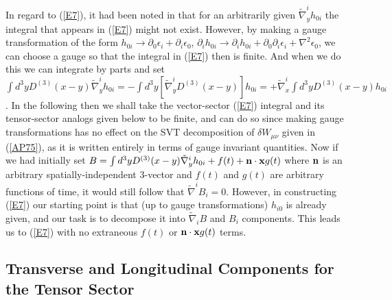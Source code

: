 \documentclass[aps]{revtex4}
\begin{document}
In regard to (\ref{E7}), it had been noted in \cite{Mannheim2005} that  for an arbitrarily  given $\tilde{\nabla}_y^ih_{0i}$ the integral that appears in (\ref{E7}) might not exist. However, by making a gauge transformation  of the form $h_{0i}\rightarrow \partial_0 \epsilon_i+\partial_i\epsilon_0$, $\partial_ih_{0i}\rightarrow \partial_i h_{0i}+\partial_0\partial_i\epsilon_i+\nabla^2\epsilon_0$, we can choose a gauge so that the integral in (\ref{E7}) then is finite.  And when we do this we can integrate by parts and set $\int d^3yD^{(3)}(x-y)\tilde{\nabla}_y^ih_{0i}=-\int d^3y[\tilde{\nabla}_y^iD^{(3)}(x-y)]h_{0i}=
+\tilde{\nabla}_x^i\int d^3yD^{(3)}(x-y)h_{0i}$. In the following then we shall take the vector-sector (\ref{E7}) integral  and its tensor-sector analogs given below to be finite, and can do so since making gauge transformations has no effect on the SVT decomposition of $\delta W_{\mu\nu}$ given in (\ref{AP75}), as it is written entirely in terms of gauge invariant quantities. Now if we had initially set $B=\int d^3yD^{(3)}(x-y)\tilde{\nabla}_y^ih_{0i}+f(t)+{\bf n}\cdot {\bf x} g(t)$ where ${\bf n}$ is an arbitrary spatially-independent 3-vector and $f(t)$ and $g(t)$ are arbitrary functions of time, it would still follow that $\tilde{\nabla}^iB_i=0$. However, in constructing (\ref{E7}) our starting point is that (up to  gauge transformations) $h_{i0}$ is already given, and our task is to decompose it into $\tilde{\nabla}_iB$ and $B_i$ components. This leads us to (\ref{E7}) with no extraneous $f(t)$ or ${\bf n}\cdot {\bf x} g(t)$ terms. 

\subsection{Transverse and Longitudinal Components for the Tensor Sector}
\end{document}
